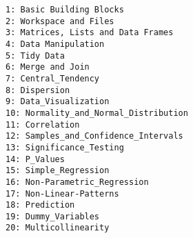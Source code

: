 \documentclass[12pt,article]{article}
\begin{document}
\large
\begin{verbatim}
1: Basic Building Blocks
2: Workspace and Files
3: Matrices, Lists and Data Frames
4: Data Manipulation
5: Tidy Data
6: Merge and Join
7: Central_Tendency
8: Dispersion
9: Data_Visualization
10: Normality_and_Normal_Distribution
11: Correlation
12: Samples_and_Confidence_Intervals
13: Significance_Testing
14: P_Values
15: Simple_Regression
16: Non-Parametric_Regression
17: Non-Linear-Patterns
18: Prediction
19: Dummy_Variables
20: Multicollinearity
\end{verbatim}
\end{document}
